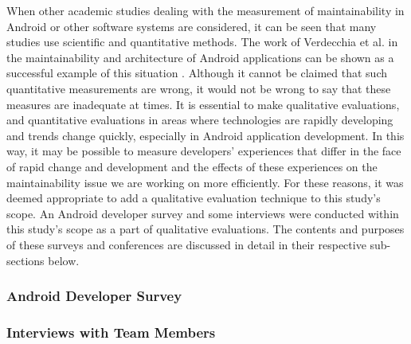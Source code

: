 When other academic studies dealing with the measurement of maintainability in Android or other software systems are considered, it can be seen that many studies use scientific and quantitative methods. The work of Verdecchia et al. in the maintainability and architecture of Android applications can be shown as a successful example of this situation \cite{14}. Although it cannot be claimed that such quantitative measurements are wrong, it would not be wrong to say that these measures are inadequate at times. It is essential to make qualitative evaluations, and quantitative evaluations in areas where technologies are rapidly developing and trends change quickly, especially in Android application development. In this way, it may be possible to measure developers' experiences that differ in the face of rapid change and development and the effects of these experiences on the maintainability issue we are working on more efficiently. For these reasons, it was deemed appropriate to add a qualitative evaluation technique to this study’s scope. An Android developer survey and some interviews were conducted within this study's scope as a part of qualitative evaluations. The contents and purposes of these surveys and conferences are discussed in detail in their respective sub-sections below.

\subsubsection{Android Developer Survey}


\subsubsection{Interviews with Team Members}

